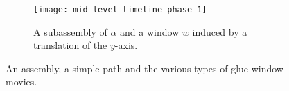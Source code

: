 \documentclass[10pt]{article}
\begin{document}
    \begin{figure}
        \centering

        \begin{subfigure}[t]{0.23\textwidth}
            \centering
            \texttt{[image: mid\_level\_timeline\_phase\_1]}
            \caption{\label{fig:mid_level_timeline_phase_1} A subassembly of $\alpha$ and a window $w$ induced by a translation of the $y$-axis.}
        \end{subfigure}%
        \caption{\label{fig:mid_level_timeline_overview} An assembly, a simple path and the various types of glue window movies. }
    \end{figure}







\end{document}
